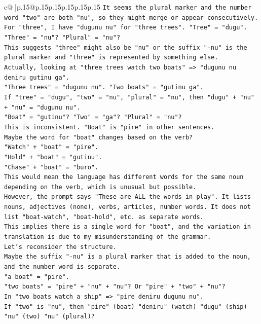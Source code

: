 \documentclass{article}
\begin{document}
{\begin{supertabular}{c@{$\;$}|p{.15\linewidth}@{}p{.15\linewidth}p{.15\linewidth}p{.15\linewidth}p{.15\linewidth}p{.15\linewidth}}
{{{\texttt{It seems the plural marker and the number word "two" are both "nu", so they might merge or appear consecutively.} \\
\texttt{For "three", I have "dugunu nu" for "three trees". "Tree" = "dugu". "Three" = "nu"? "Plural" = "nu"?} \\
\texttt{This suggests "three" might also be "nu" or the suffix "{-}nu" is the plural marker and "three" is represented by something else.} \\
\texttt{Actually, looking at "three trees watch two boats" => "dugunu nu deniru gutinu ga".} \\
\texttt{"Three trees" = "dugunu nu". "Two boats" = "gutinu ga".} \\
\texttt{If "tree" = "dugu", "two" = "nu", "plural" = "nu", then "dugu" + "nu" + "nu" = "dugunu nu".} \\
\texttt{"Boat" = "gutinu"? "Two" = "ga"? "Plural" = "nu"?} \\
\texttt{This is inconsistent. "Boat" is "pire" in other sentences.} \\
\texttt{Maybe the word for "boat" changes based on the verb?} \\
\texttt{"Watch" + "boat" = "pire".} \\
\texttt{"Hold" + "boat" = "gutinu".} \\
\texttt{"Chase" + "boat" = "buro".} \\
\texttt{This would mean the language has different words for the same noun depending on the verb, which is unusual but possible.} \\
\texttt{However, the prompt says "These are ALL the words in play". It lists nouns, adjectives (none), verbs, articles, number words. It does not list "boat{-}watch", "boat{-}hold", etc. as separate words.} \\
\texttt{This implies there is a single word for "boat", and the variation in translation is due to my misunderstanding of the grammar.} \\
\texttt{Let's reconsider the structure.} \\
\texttt{Maybe the suffix "{-}nu" is a plural marker that is added to the noun, and the number word is separate.} \\
\texttt{"a boat" = "pire".} \\
\texttt{"two boats" = "pire" + "nu" + "nu"? Or "pire" + "two" + "nu"?} \\
\texttt{In "two boats watch a ship" => "pire deniru dugunu nu".} \\
\texttt{If "two" is "nu", then "pire" (boat) "deniru" (watch) "dugu" (ship) "nu" (two) "nu" (plural)?} \\
}}}
\end{supertabular}}
\end{document}
